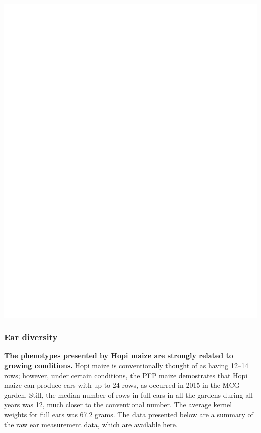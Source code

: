 \documentclass[12pt,]{article}
\begin{document}
\includegraphics{images/yield-plot-1.pdf}

\hypertarget{ear-diversity}{%
\subsubsection*{Ear diversity}\label{ear-diversity}}

\textbf{The phenotypes presented by Hopi maize are strongly related to growing conditions.} Hopi maize is conventionally thought of as having 12--14 rows; however, under certain conditions, the PFP maize demostrates that Hopi maize can produce ears with up to 24 rows, as occurred in 2015 in the MCG garden. Still, the median number of rows in full ears in all the gardens during all years was 12, much closer to the conventional number. The average kernel weights for full ears was 67.2 grams. The data presented below are a summary of the raw ear measurement data, which are available here.
\end{document}
